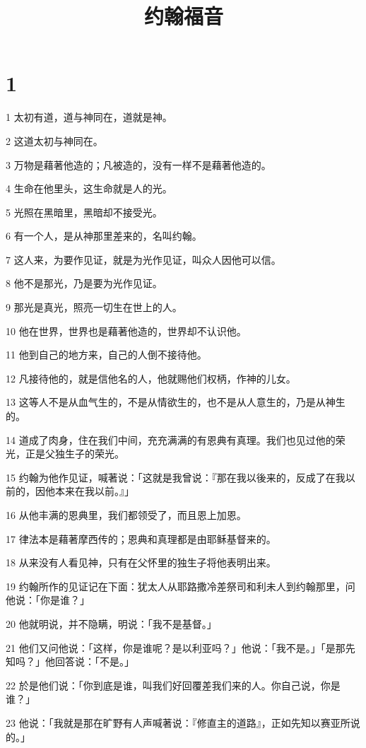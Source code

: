 

\title{约翰福音}


\chapter{1}

\par 1 太初有道，道与神同在，道就是神。
\par 2 这道太初与神同在。
\par 3 万物是藉著他造的；凡被造的，没有一样不是藉著他造的。
\par 4 生命在他里头，这生命就是人的光。
\par 5 光照在黑暗里，黑暗却不接受光。
\par 6 有一个人，是从神那里差来的，名叫约翰。
\par 7 这人来，为要作见证，就是为光作见证，叫众人因他可以信。
\par 8 他不是那光，乃是要为光作见证。
\par 9 那光是真光，照亮一切生在世上的人。
\par 10 他在世界，世界也是藉著他造的，世界却不认识他。
\par 11 他到自己的地方来，自己的人倒不接待他。
\par 12 凡接待他的，就是信他名的人，他就赐他们权柄，作神的儿女。
\par 13 这等人不是从血气生的，不是从情欲生的，也不是从人意生的，乃是从神生的。
\par 14 道成了肉身，住在我们中间，充充满满的有恩典有真理。我们也见过他的荣光，正是父独生子的荣光。
\par 15 约翰为他作见证，喊著说：「这就是我曾说：『那在我以後来的，反成了在我以前的，因他本来在我以前。』」
\par 16 从他丰满的恩典里，我们都领受了，而且恩上加恩。
\par 17 律法本是藉著摩西传的；恩典和真理都是由耶稣基督来的。
\par 18 从来没有人看见神，只有在父怀里的独生子将他表明出来。
\par 19 约翰所作的见证记在下面：犹太人从耶路撒冷差祭司和利未人到约翰那里，问他说：「你是谁？」
\par 20 他就明说，并不隐瞒，明说：「我不是基督。」
\par 21 他们又问他说：「这样，你是谁呢？是以利亚吗？」他说：「我不是。」「是那先知吗？」他回答说：「不是。」
\par 22 於是他们说：「你到底是谁，叫我们好回覆差我们来的人。你自己说，你是谁？」
\par 23 他说：「我就是那在旷野有人声喊著说：『修直主的道路』，正如先知以赛亚所说的。」
